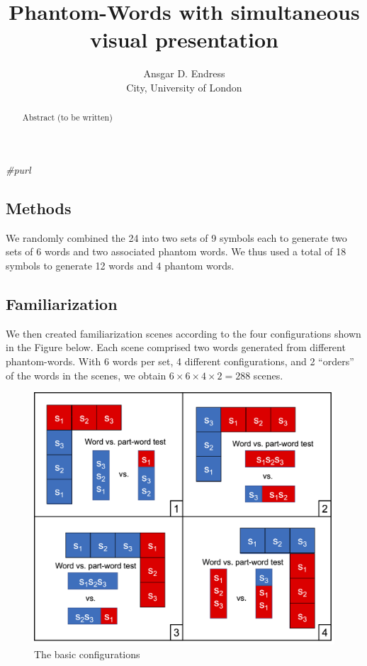 \documentclass[
]{article}
\title{Phantom-Words with simultaneous visual presentation}
\author{Ansgar D. Endress\\
City, University of London}
\date{}
\newenvironment{Shaded}{\begin{snugshade}}{\end{snugshade}}
\newcommand{\CommentTok}[1]{\textcolor[rgb]{0.56,0.35,0.01}{\textit{#1}}}
\begin{document}
\maketitle
\begin{abstract}
Abstract (to be written)
\end{abstract}

\begin{Shaded}
\begin{Highlighting}[]
\CommentTok{\#purl}
\end{Highlighting}
\end{Shaded}

\hypertarget{methods}{%
\subsection{Methods}\label{methods}}

We randomly combined the 24 into two sets of 9 symbols each to generate
two sets of 6 words and two associated phantom words. We thus used a
total of 18 symbols to generate 12 words and 4 phantom words.

\hypertarget{familiarization}{%
\subsection{Familiarization}\label{familiarization}}

We then created familiarization scenes according to the four
configurations shown in the Figure below. Each scene comprised two words
generated from different phantom-words. With 6 words per set, 4
different configurations, and 2 ``orders'' of the words in the scenes,
we obtain \(6 \times 6 \times 4 \times 2 = 288\) scenes.

\begin{figure}
\centering
\includegraphics{../figs/configurations.png}
\caption{The basic configurations}
\end{figure}
\end{document}
